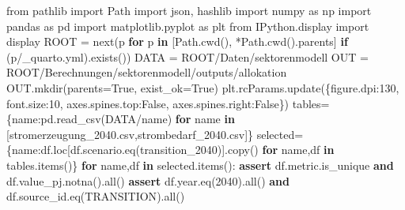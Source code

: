 \documentclass[
  ngerman,
  a4paper,
  DIV=11]{scrreprt}
\newenvironment{Shaded}{\begin{snugshade}}{\end{snugshade}}
\newcommand{\BuiltInTok}[1]{\textcolor[rgb]{0.00,0.23,0.31}{#1}}
\newcommand{\ControlFlowTok}[1]{\textcolor[rgb]{0.00,0.23,0.31}{\textbf{#1}}}
\newcommand{\DecValTok}[1]{\textcolor[rgb]{0.68,0.00,0.00}{#1}}
\newcommand{\ImportTok}[1]{\textcolor[rgb]{0.00,0.46,0.62}{#1}}
\newcommand{\KeywordTok}[1]{\textcolor[rgb]{0.00,0.23,0.31}{\textbf{#1}}}
\newcommand{\NormalTok}[1]{\textcolor[rgb]{0.00,0.23,0.31}{#1}}
\newcommand{\OperatorTok}[1]{\textcolor[rgb]{0.37,0.37,0.37}{#1}}
\newcommand{\StringTok}[1]{\textcolor[rgb]{0.13,0.47,0.30}{#1}}
\newcommand{\VariableTok}[1]{\textcolor[rgb]{0.07,0.07,0.07}{#1}}
\begin{document}
\begin{Shaded}
\begin{Highlighting}[]
\ImportTok{from}\NormalTok{ pathlib }\ImportTok{import}\NormalTok{ Path}
\ImportTok{import}\NormalTok{ json, hashlib}
\ImportTok{import}\NormalTok{ numpy }\ImportTok{as}\NormalTok{ np}
\ImportTok{import}\NormalTok{ pandas }\ImportTok{as}\NormalTok{ pd}
\ImportTok{import}\NormalTok{ matplotlib.pyplot }\ImportTok{as}\NormalTok{ plt}
\ImportTok{from}\NormalTok{ IPython.display }\ImportTok{import}\NormalTok{ display}
\NormalTok{ROOT }\OperatorTok{=} \BuiltInTok{next}\NormalTok{(p }\ControlFlowTok{for}\NormalTok{ p }\KeywordTok{in}\NormalTok{ [Path.cwd(), }\OperatorTok{*}\NormalTok{Path.cwd().parents] }\ControlFlowTok{if}\NormalTok{ (p}\OperatorTok{/}\StringTok{\textquotesingle{}\_quarto.yml\textquotesingle{}}\NormalTok{).exists())}
\NormalTok{DATA }\OperatorTok{=}\NormalTok{ ROOT}\OperatorTok{/}\StringTok{\textquotesingle{}Daten/sektorenmodell\textquotesingle{}}
\NormalTok{OUT }\OperatorTok{=}\NormalTok{ ROOT}\OperatorTok{/}\StringTok{\textquotesingle{}Berechnungen/sektorenmodell/outputs/allokation\textquotesingle{}}
\NormalTok{OUT.mkdir(parents}\OperatorTok{=}\VariableTok{True}\NormalTok{, exist\_ok}\OperatorTok{=}\VariableTok{True}\NormalTok{)}
\NormalTok{plt.rcParams.update(\{}\StringTok{\textquotesingle{}figure.dpi\textquotesingle{}}\NormalTok{:}\DecValTok{130}\NormalTok{, }\StringTok{\textquotesingle{}font.size\textquotesingle{}}\NormalTok{:}\DecValTok{10}\NormalTok{, }\StringTok{\textquotesingle{}axes.spines.top\textquotesingle{}}\NormalTok{:}\VariableTok{False}\NormalTok{, }\StringTok{\textquotesingle{}axes.spines.right\textquotesingle{}}\NormalTok{:}\VariableTok{False}\NormalTok{\})}
\NormalTok{tables}\OperatorTok{=}\NormalTok{\{name:pd.read\_csv(DATA}\OperatorTok{/}\NormalTok{name) }\ControlFlowTok{for}\NormalTok{ name }\KeywordTok{in}\NormalTok{ [}\StringTok{\textquotesingle{}stromerzeugung\_2040.csv\textquotesingle{}}\NormalTok{,}\StringTok{\textquotesingle{}strombedarf\_2040.csv\textquotesingle{}}\NormalTok{]\}}
\NormalTok{selected}\OperatorTok{=}\NormalTok{\{name:df.loc[df.scenario.eq(}\StringTok{\textquotesingle{}transition\_2040\textquotesingle{}}\NormalTok{)].copy() }\ControlFlowTok{for}\NormalTok{ name,df }\KeywordTok{in}\NormalTok{ tables.items()\}}
\ControlFlowTok{for}\NormalTok{ name,df }\KeywordTok{in}\NormalTok{ selected.items():}
    \ControlFlowTok{assert}\NormalTok{ df.metric.is\_unique }\KeywordTok{and}\NormalTok{ df.value\_pj.notna().}\BuiltInTok{all}\NormalTok{()}
    \ControlFlowTok{assert}\NormalTok{ df.year.eq(}\DecValTok{2040}\NormalTok{).}\BuiltInTok{all}\NormalTok{() }\KeywordTok{and}\NormalTok{ df.source\_id.eq(}\StringTok{\textquotesingle{}TRANSITION\textquotesingle{}}\NormalTok{).}\BuiltInTok{all}\NormalTok{()}

\end{Highlighting}
\end{Shaded}
\end{document}
